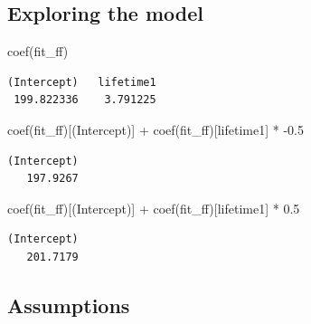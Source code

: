\documentclass[
  letterpaper,
  DIV=11,
  numbers=noendperiod]{scrartcl}
\newenvironment{Shaded}{\begin{snugshade}}{\end{snugshade}}
\newcommand{\FloatTok}[1]{\textcolor[rgb]{0.68,0.00,0.00}{#1}}
\newcommand{\FunctionTok}[1]{\textcolor[rgb]{0.28,0.35,0.67}{#1}}
\newcommand{\NormalTok}[1]{\textcolor[rgb]{0.00,0.23,0.31}{#1}}
\newcommand{\SpecialCharTok}[1]{\textcolor[rgb]{0.37,0.37,0.37}{#1}}
\newcommand{\StringTok}[1]{\textcolor[rgb]{0.13,0.47,0.30}{#1}}
\begin{document}
\hypertarget{exploring-the-model-3}{%
\subsection*{Exploring the model}\label{exploring-the-model-3}}

\begin{Shaded}
\begin{Highlighting}[]
\FunctionTok{coef}\NormalTok{(fit\_ff)}
\end{Highlighting}
\end{Shaded}

\begin{verbatim}
(Intercept)   lifetime1 
 199.822336    3.791225 
\end{verbatim}

\begin{Shaded}
\begin{Highlighting}[]
\FunctionTok{coef}\NormalTok{(fit\_ff)[}\StringTok{\textquotesingle{}(Intercept)\textquotesingle{}}\NormalTok{] }\SpecialCharTok{+} \FunctionTok{coef}\NormalTok{(fit\_ff)[}\StringTok{\textquotesingle{}lifetime1\textquotesingle{}}\NormalTok{] }\SpecialCharTok{*} \SpecialCharTok{{-}}\FloatTok{0.5}
\end{Highlighting}
\end{Shaded}

\begin{verbatim}
(Intercept) 
   197.9267 
\end{verbatim}

\begin{Shaded}
\begin{Highlighting}[]
\FunctionTok{coef}\NormalTok{(fit\_ff)[}\StringTok{\textquotesingle{}(Intercept)\textquotesingle{}}\NormalTok{] }\SpecialCharTok{+} \FunctionTok{coef}\NormalTok{(fit\_ff)[}\StringTok{\textquotesingle{}lifetime1\textquotesingle{}}\NormalTok{] }\SpecialCharTok{*} \FloatTok{0.5}
\end{Highlighting}
\end{Shaded}

\begin{verbatim}
(Intercept) 
   201.7179 
\end{verbatim}

\hypertarget{assumptions}{%
\subsection{Assumptions}\label{assumptions}}
\end{document}
